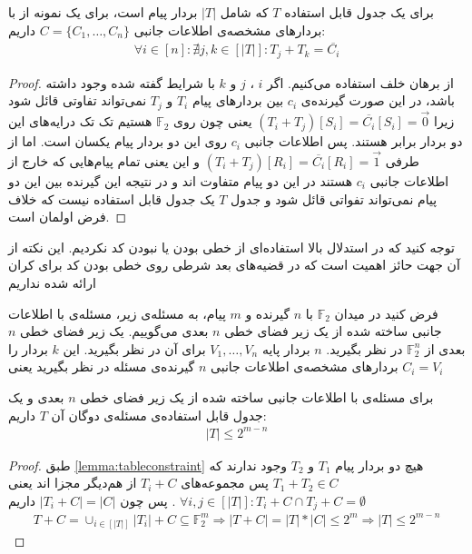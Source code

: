 \begin{lemma}
	\label{lemma:tableconstraint}
	برای یک جدول قابل استفاده
	$T$
	که شامل
	$|T|$
	بردار پیام است، برای یک نمونه از
	\picod
	با بردارهای مشخصه‌ی اطلاعات جانبی
	$C = \{C_1, \ldots, C_n\}$
	داریم:
	\begin{align}
		\forall i \in [n]: \nexists j, k \in [|T|]: T_j + T_k = \overline{C_i}
	\end{align}
\end{lemma}
\begin{proof}
	از برهان خلف استفاده می‌کنیم. اگر
	$i$
	،
	$j$
	و
	$k$
	با شرایط گفته شده وجود داشته باشد، در این صورت گیرنده‌ی
	$c_i$
	بین بردارهای پیام
	$T_i$
	و
	$T_j$
	نمی‌تواند تفاوتی قائل شود زیرا
	$(T_i + T_j)[S_i] = \overline{C_i}[S_i] = \vec{0}$
	یعنی چون روی
	$\mathbb{F}_2$
	هستیم تک تک درایه‌های این دو بردار برابر هستند. پس اطلاعات جانبی
	$c_i$
	روی این دو بردار پیام یکسان است. اما از طرفی
	$(T_i + T_j)[R_i] = \overline{C_i}[R_i] = \vec{1}$
	و این یعنی تمام پیام‌هایی که خارج از اطلاعات جانبی
	$c_i$
	هستند در این دو پیام متفاوت اند و در نتیجه این گیرنده بین این دو پیام نمی‌تواند تفواتی قائل شود و جدول
	$T$
	یک جدول قابل استفاده نیست که خلاف فرض اولمان است.
\end{proof}
\begin{remark}
توجه کنید که در استدلال بالا استفاده‌ای از خطی بودن یا نبودن کد نکردیم. این نکته از آن جهت حائز اهمیت است که در قضیه‌های بعد شرطی روی خطی بودن کد برای کران ارائه شده نداریم
\end{remark}
\begin{definition}
	فرض کنید در میدان
	$\mathbb{F}_2$
	با 
	$n$
	گیرنده و 
	$m$
	پیام، به مسئله‌ی زیر، مسئله‌ی 
	\picod
	با اطلاعات جانبی ساخته شده از یک زیر فضای خطی
	$n$
	بعدی می‌گوییم. یک زیر فضای خطی 
	$n$
	بعدی از
	$\mathbb{F}^n_2$
	در نظر بگیرید.
	$n$
	بردار پایه
	$V_1, \ldots, V_n$
	برای آن در نظر بگیرید. این 
	$k$
	بردار را بردارهای مشخصه‌ی اطلاعات جانبی 
	$n$
	گیرنده‌ی مسئله در نظر بگیرید یعنی
	$C_i = V_i$
\end{definition}

\begin{theorem}
	برای مسئله‌ی
	\picod
	با اطلاعات جانبی ساخته شده از یک زیر فضای خطی
	$n$
	بعدی و یک جدول قابل استفاده‌ی مسئله‌ی دوگان آن
	$T$
	داریم:
	\begin{align*}
		|T| \leq 2^{m - n}
	\end{align*}
\end{theorem}
\begin{proof}
	طبق
	\autoref{lemma:tableconstraint}
	هیچ دو بردار پیام
	$T_1$
	و
	$T_2$
	وجود ندارند که
	$T_1 + T_2 \in C$
	پس مجموعه‌های
	$T_i + C$
	از هم‌دیگر مجزا اند یعنی
	$\forall i, j \in [|T|]: T_i + C \cap T_j + C = \emptyset$
	. پس چون
	$|T_i + C| = |C|$
	داریم
	\begin{align}
	T + C =  \cup_{i \in [|T|]} |T_i| + C \subseteq \mathbb{F}_2^m \Rightarrow |T + C| = |T| * |C| \leq 2^m \Rightarrow |T| \leq 2^{m - n}
		\end{align}
\end{proof}

